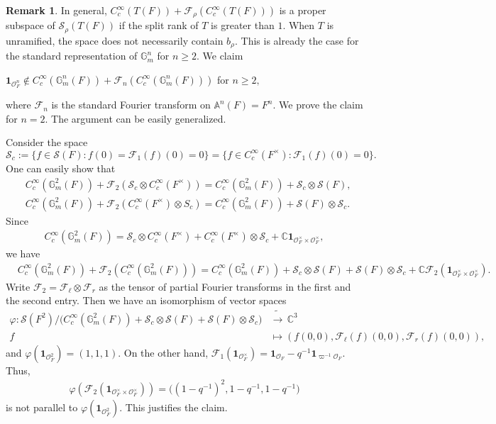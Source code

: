 \documentclass[10pt]{amsart}
\theoremstyle{definition}
\newtheorem{remark}[theorem]{Remark}
\numberwithin{equation}{section}
\numberwithin{equation}{subsection}
\newcommand{\CC}{\mathbb{C}}
\newcommand{\GG}{\mathbb{G}}
\begin{document}
\begin{remark}\label{rem:faillocal}
    In general, $C^\infty_c(T(F))+\mathcal{F}_\rho(C^\infty_c(T(F)))$
    is a proper subspace of $\mathcal{S}_\rho(T(F))$ if the split rank of $T$ is greater than $1$. When
    $T$ is unramified, the space does not necessarily contain $b_\rho$. This is already the case for the standard representation of $\GG_m^n$ for $n\ge 2$. We claim 
    \begin{center}
        $\mathbf{1}_{\mathcal{O}_F^n}\notin C^\infty_c(\GG_m^n(F))+\mathcal{F}_n(C^\infty_c(\GG_m^n(F)))$ for $n\ge 2,$
    \end{center}
    where $\mathcal{F}_n$ is the standard Fourier transform on $\mathbb{A}^n(F)=F^n.$ We prove the claim for $n=2.$ The argument can be easily generalized.

    Consider the space $$\mathcal{S}_c:=\{f\in \mathcal{S}(F): f(0)=\mathcal{F}_1(f)(0)=0\}=\{f\in C^\infty_c(F^\times):\mathcal{F}_1(f)(0)=0\}.$$
    One can easily show that 
    \begin{align*}
        &C_c^\infty(\GG_m^2(F))+\mathcal{F}_{2}(\mathcal{S}_c\otimes C^\infty_c(F^\times))=C^\infty_c(\GG_m^2(F))+\mathcal{S}_c\otimes \mathcal{S}(F),\\
        &C_c^\infty(\GG_m^2(F))+\mathcal{F}_{2}(C^\infty_c(F^\times)\otimes S_c)=C_c^\infty(\GG_m^2(F))+\mathcal{S}(F)\otimes \mathcal{S}_c.
    \end{align*}
    Since 
    \begin{align*}
        C^\infty_c(\GG_m^2(F))=\mathcal{S}_c\otimes C^\infty_c(F^\times)+C^\infty_c(F^\times)\otimes \mathcal{S}_c+\CC\mathbf1{_{\mathcal{O}_F^\times\times \mathcal{O}_F^\times}},
    \end{align*}
 we have
    \begin{align*}
       &C^\infty_c(\GG_m^2(F))+\mathcal{F}_2(C^\infty_c(\GG_m^2(F)))=C^\infty_c(\GG_m^2(F))+\mathcal{S}_c\otimes \mathcal{S}(F)+ \mathcal{S}(F)\otimes \mathcal{S}_c+\CC\mathcal{F}_2(\mathbf{1}_{\mathcal{O}_F^\times\times \mathcal{O}_F^\times}).
    \end{align*}
Write $\mathcal{F}_2=\mathcal{F}_\ell\otimes\mathcal{F}_r$ as the tensor of partial Fourier transforms in the first and the second entry. Then we have an isomorphism of vector spaces
\begin{align*}
    \varphi:\mathcal{S}(F^2)/\bigg(C^\infty_c(\GG_m^2(F))+\mathcal{S}_c\otimes \mathcal{S}(F)+ \mathcal{S}(F)\otimes \mathcal{S}_c\bigg)&\tilde{\longrightarrow}\, \CC^3\\
    f&\mapsto (f(0,0),\mathcal{F}_\ell(f)(0,0),\mathcal{F}_r(f)(0,0)),
\end{align*}
and $\varphi(\mathbf{1}_{\mathcal{O}_F^2})=(1,1,1).$ On the other hand, $\mathcal{F}_1(\mathbf{1}_{\mathcal{O}_F^\times})=\mathbf{1}_{\mathcal{O}_F}-q^{-1}\mathbf{1}_{\varpi^{-1}\mathcal{O}_F}.$ Thus,
\begin{align*}
    \varphi(\mathcal{F}_2(\mathbf{1}_{\mathcal{O}_F^\times\times \mathcal{O}_F^\times}))=\big((1-q^{-1})^2,1-q^{-1},1-q^{-1}\big)
\end{align*}
is not parallel to $\varphi(\mathbf{1}_{\mathcal{O}_F^2}).$ This justifies the claim. 
\end{remark}
\end{document}
